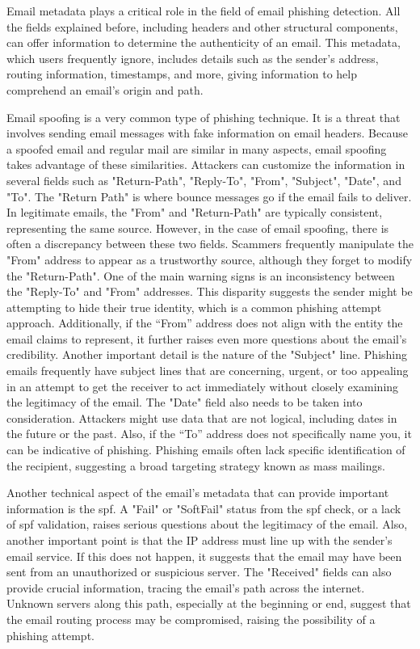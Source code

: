 Email metadata plays a critical role in the field of email phishing detection. All the fields explained before, including headers and other structural components, can offer information to determine the authenticity of an email. This metadata, which users frequently ignore, includes details such as the sender's address, routing information, timestamps, and more, giving information to help comprehend an email's origin and path.

Email spoofing is a very common type of phishing technique. It is a threat that involves sending email messages with fake information on email headers. Because a spoofed email and regular mail are similar in many aspects, email spoofing takes advantage of these similarities. Attackers can customize the information in several fields such as "Return-Path", "Reply-To", "From", "Subject", "Date", and "To".
The "Return Path" is where bounce messages go if the email fails to deliver. In legitimate emails, the "From" and "Return-Path" are typically consistent, representing the same source. However, in the case of email spoofing, there is often a discrepancy between these two fields. Scammers frequently manipulate the "From" address to appear as a trustworthy source, although they forget to modify the "Return-Path".
One of the main warning signs is an inconsistency between the "Reply-To" and "From" addresses. This disparity suggests the sender might be attempting to hide their true identity, which is a common phishing attempt approach. Additionally, if the “From” address does not align with the entity the email claims to represent, it further raises even more questions about the email's credibility. 
Another important detail is the nature of the "Subject" line. Phishing emails frequently have subject lines that are concerning, urgent, or too appealing in an attempt to get the receiver to act immediately without closely examining the legitimacy of the email. 
The "Date" field also needs to be taken into consideration. Attackers might use data that are not logical, including dates in the future or the past. Also, if the “To” address does not specifically name you, it can be indicative of phishing. Phishing emails often lack specific identification of the recipient, suggesting a broad targeting strategy known as mass mailings.

Another technical aspect of the email's metadata that can provide important information is the \ac{spf}. A "Fail" or "SoftFail" status from the \ac{spf} check, or a lack of \ac{spf} validation, raises serious questions about the legitimacy of the email. Also, another important point is that the IP address must line up with the sender's email service. If this does not happen, it suggests that the email may have been sent from an unauthorized or suspicious server. The "Received" fields can also provide crucial information, tracing the email's path across the internet. Unknown servers along this path, especially at the beginning or end, suggest that the email routing process may be compromised, raising the possibility of a phishing attempt.\\

